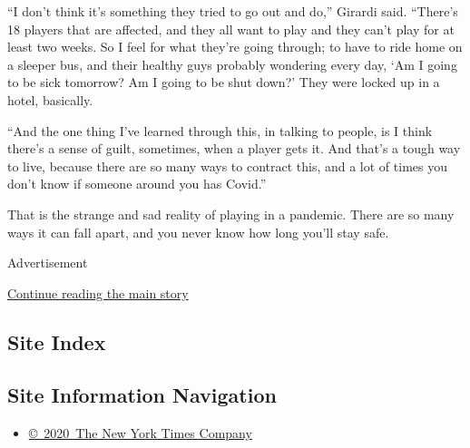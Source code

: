 ``I don't think it's something they tried to go out and do,'' Girardi
said. ``There's 18 players that are affected, and they all want to play
and they can't play for at least two weeks. So I feel for what they're
going through; to have to ride home on a sleeper bus, and their healthy
guys probably wondering every day, `Am I going to be sick tomorrow? Am I
going to be shut down?' They were locked up in a hotel, basically.

``And the one thing I've learned through this, in talking to people, is
I think there's a sense of guilt, sometimes, when a player gets it. And
that's a tough way to live, because there are so many ways to contract
this, and a lot of times you don't know if someone around you has
Covid.''

That is the strange and sad reality of playing in a pandemic. There are
so many ways it can fall apart, and you never know how long you'll stay
safe.

Advertisement

\protect\hyperlink{after-bottom}{Continue reading the main story}

\hypertarget{site-index}{%
\subsection{Site Index}\label{site-index}}

\hypertarget{site-information-navigation}{%
\subsection{Site Information
Navigation}\label{site-information-navigation}}

\begin{itemize}
\tightlist
\item
  \href{https://help.nytimes.com/hc/en-us/articles/115014792127-Copyright-notice}{©~2020~The
  New York Times Company}
\end{itemize}

